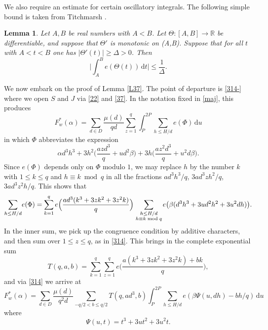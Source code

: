 \documentclass[reqno]{amsart}
\newcommand\RR{{\mathbb R}}
\newcommand{\multsum}[2]{\sum_{{\scriptstyle #1}\atop {\scriptstyle #2}}}
\newcommand\dd{{\mathrm d}}
\newtheorem{lemma}[thm]{Lemma}
\numberwithin{equation}{section}
\begin{document}
We also require an estimate for certain oscillatory integrals. The following simple bound is taken from Titchmarsh \cite[Lemma 4.2]{Tit}.

\begin{lemma} \label{Tit} Let $A,B$ be real numbers with $A<B$. Let $\Theta: [A,B] \to \RR$ be  differentiable, and suppose that $\Theta'$ is monotonic on (A,B). Suppose that for all $t$ with $A<t<B$ one has $|\Theta'(t)| \ge \Delta>0$. Then
$$ \Big|\int_A^B e(\Theta(t))\,\mathrm d t\Big| \le \frac1\Delta. $$
\end{lemma} 

We now embark on the proof of Lemma \ref{L37}. The point of departure is \eqref{314-}
where we open $S$ and $J$ via \eqref{22} and \eqref{37}. In the notation fixed in \eqref{maj}, this produces
\begin{equation}\label{314} F^*_w(\alpha) =  
\sum_{d\in D} \frac{\mu(d)}{qd} \sum_{z=1}^q \int_P^{2P} \sum_{h\le H/d} e(\Phi)\,\dd u \end{equation}
in which $\Phi$ abbreviates the expression
$$ \alpha d^3h^3 + 3 h^2\Big(\frac{azd^3}{q} +ud^2\beta\Big) + 3h \Big(\frac{az^2d^3}{q} +u^2d\beta\Big). $$
Since $e(\Phi)$ depends only on $\Phi$ modulo $1$, we may replace $h$ 
by the number $k$ with $1\le k\le q$ and $h\equiv k \bmod q$ in all the fractions
$ad^3h^3/q$, $3ad^3z h^2/q$, $3ad^3z^2h/q$. This shows that
$$ \sum_{h\le H/d}\! e(\Phi) = \sum_{k=1}^q e\Big(\frac{ad^3(k^3+3zk^2+3z^2k)}{q}\Big) \multsum{h\le H/d}{h\equiv k\bmod q}\! e\big(\beta(d^3h^3+3ud^2h^2+3u^2dh)\big). $$ 
In the inner sum, we pick up the congruence condition by additive characters, and then sum over $1\le z\le q$, as in \eqref{314}. This brings in the complete exponential sum
\begin{equation}\label{315} T(q,a,b) = \sum_{k=1}^q \sum_{z=1}^q  e\Big(\frac{a(k^3+3zk^2+3z^2k)+bk}{q}\Big), \end{equation}
and via \eqref{314} we arrive at 
\begin{equation}\label{316} F_w^*(\alpha) = \sum_{d\in D}\frac{\mu(d)}{q^2d} \sum_{-q/2<b\le q/2} T(q,ad^3, b) \int_P^{2P} \sum_{h\le H/d} e(\beta\Psi(u,dh) - bh/q)\,\dd u \end{equation}
where
$$\Psi(u,t) = t^3 + 3ut^2 + 3u^2t. $$
\end{document}
